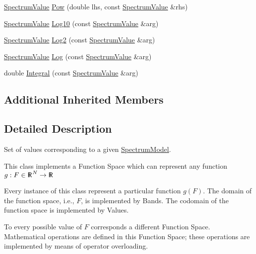 \begin{DoxyCompactItemize}
\item 
\hyperlink{classns3_1_1SpectrumValue}{Spectrum\+Value} \hyperlink{classns3_1_1SpectrumValue_afd31f0d8925eab018395edcdda73b482}{Pow} (double lhs, const \hyperlink{classns3_1_1SpectrumValue}{Spectrum\+Value} \&rhs)
\item 
\hyperlink{classns3_1_1SpectrumValue}{Spectrum\+Value} \hyperlink{classns3_1_1SpectrumValue_a7ae6505ecfde34bf968942c494b8cfe2}{Log10} (const \hyperlink{classns3_1_1SpectrumValue}{Spectrum\+Value} \&arg)
\item 
\hyperlink{classns3_1_1SpectrumValue}{Spectrum\+Value} \hyperlink{classns3_1_1SpectrumValue_a5ae9267c3b406f7730426b29b96b188b}{Log2} (const \hyperlink{classns3_1_1SpectrumValue}{Spectrum\+Value} \&arg)
\item 
\hyperlink{classns3_1_1SpectrumValue}{Spectrum\+Value} \hyperlink{classns3_1_1SpectrumValue_a91992701f8d075c5b6a1503a489de8d5}{Log} (const \hyperlink{classns3_1_1SpectrumValue}{Spectrum\+Value} \&arg)
\item 
double \hyperlink{classns3_1_1SpectrumValue_a343ff1c59bdfb39751e1f56f4cd3542c}{Integral} (const \hyperlink{classns3_1_1SpectrumValue}{Spectrum\+Value} \&arg)
\end{DoxyCompactItemize}
\subsection*{Additional Inherited Members}


\subsection{Detailed Description}
Set of values corresponding to a given \hyperlink{classns3_1_1SpectrumModel}{Spectrum\+Model}. 

This class implements a Function Space which can represent any function $ g: F \in {\sf R\hspace*{-0.9ex}\rule{0.15ex}{1.5ex}\hspace*{0.9ex}}^N \rightarrow {\sf R\hspace*{-0.9ex}\rule{0.15ex}{1.5ex}\hspace*{0.9ex}} $

Every instance of this class represent a particular function $ g(F) $. The domain of the function space, i.\+e., $ F $, is implemented by Bands. The codomain of the function space is implemented by Values.

To every possible value of $ F$ corresponds a different Function Space. Mathematical operations are defined in this Function Space; these operations are implemented by means of operator overloading.

